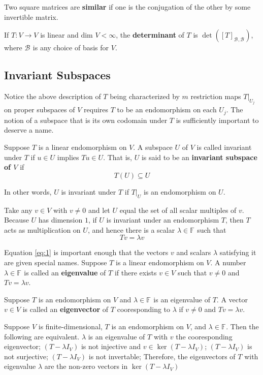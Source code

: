 \documentclass[11pt]{article} %
\newcommand\B[1]{\text{$\mathcal{B}_{#1}$}}
\newcommand\F[1]{\text{$\mathbb{F^{#1}}$}}
\newcommand\V{\text{$V$}}
\newcommand\U{\text{$U$}}
\newcommand\0{\text{$\mathbf{0}$}}
\renewcommand\dim{\text{dim }}
\begin{document}
{Two square matrices are \textbf{similar} if one is the conjugation of the other by some invertible matrix.}

{If $T: \V \to \V$ is linear and $\dim V < \infty$, the \textbf{determinant} of $T$ is $\det([T]_{\B{},\B{}})$, where $\B{}$ is any choice of basis for $\V$.}


\subsection{Invariant Subspaces}
Notice the above description of $T$ being characterized by $m$ restriction maps $T |_{\U_j}$ on proper subspaces of $\V$ requires $T$ to be an endomorphism on each $\U_j$. The notion of a subspace that is its own codomain under $T$ is sufficiently important to deserve a name.

{Suppose $T$ is a linear endomorphism on $\V$. A subspace $\U$ of $\V$ is called invariant under $T$ if $u \in \U$ implies $Tu \in \U$. That is, $\U$ is said to be an \textbf{invariant subspace of $\V$} if
$$
T(\U) \subseteq \U
$$} 

\noindent
In other words, $\U$ is invariant under $T$ if $T|_U$ is an endomorphism on $\U$.

Take any $v \in V$ with $v \ne0$ and let $\U$ equal the set of all scalar multiples of $v$. Because $U$ has dimension $1$, if $U$ is invariant under an endomorphism $T$, then $T$ acts as multiplication on $U$, and hence there is a scalar $\lambda \in \F{}$ such that
\begin{equation} \label{eq:1}
Tv = \lambda v
\end{equation}

Equation \ref{eq:1} is important enough that the vectors $v$ and scalars $\lambda$ satisfying it are given special names.
{Suppose $T$ is a linear endomorphism on $\V$. A number $\lambda \in \F{}$ is called an \textbf{eigenvalue} of $T$ if there exists $v \in V$ such that $v \ne 0$ and $Tv = \lambda v$.}

{Suppose $T$ is an endomorphism on $\V$ and $\lambda \in \F{}$ is an eigenvalue of $T$. A vector $v \in V$ is called an \textbf{eigenvector} of $T$ cooresponding to $\lambda$ if $v \ne 0$ and $Tv = \lambda v$.}


{Suppose $\V$ is finite-dimensional, $T$ is an endomorphism on $\V$, and $\lambda \in \F{}$. Then the following are equivalent.
\points
{$\lambda$ is an eigenvalue of $T$ with $v$ the cooresponding eigenvector;}
{$(T - \lambda I_V)$ is not injective and $v \in \ker{(T - \lambda I_V)}$;}
{$(T - \lambda I_V)$ is not surjective;}
{$(T - \lambda I_V)$ is not invertable;}
Therefore, the eigenvectors of $T$ with eigenvalue $\lambda$ are the non-zero vectors in $\ker{(T-\lambda I_V)}$}{}
\end{document}
